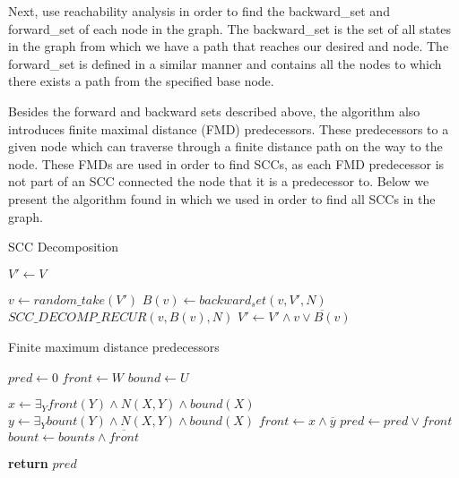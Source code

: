 \documentclass[11pt]{article}
\begin{document}
        Next, use reachability analysis in order to find the backward\_set
        and forward\_set of each node in the graph. The backward\_set is 
        the set of all states in the graph from which we have a path that
        reaches our desired and node. The forward\_set is defined in a similar
        manner and contains all the nodes to which there exists a path from
        the specified base node.

        Besides the forward and backward sets described above, the algorithm
        also introduces finite maximal distance (FMD) predecessors. These
        predecessors to a given node which can traverse through a finite
        distance path on the way to the node. These FMDs are used in order
        to find SCCs, as each FMD predecessor is not part of an SCC
        connected the node that it is a predecessor to. Below we present
        the algorithm found in \cite{scc} which we used in order to find
        all SCCs in the graph.

        \begin{algorithm}[H]
            \caption{SCC Decomposition}\label{scc}
                \State $V' \gets V$

                    \State $v \gets random\_take(V')$
                    \State $B(v) \gets backward_set(v, V', N)$
                    \State $SCC\_DECOMP\_RECUR(v, B(v), N)$
                    \State $V' \gets V' \wedge \overline{v \vee B(v)}$
                \EndWhile
            \EndProcedure
        \end{algorithm}

        \begin{algorithm}[H]
            \caption{Finite maximum distance predecessors}\label{fmd}
                \State $pred \gets 0$
                \State $front \gets W$
                \State $bound \gets U$
                
                    \State $x \gets \exists_Y front(Y)\wedge N(X, Y) \wedge bound(X)$
                    \State $y \gets \exists_Y bount(Y)\wedge N(X, Y) \wedge bound(X)$
                    \State $front \gets x \wedge \overline{y}$
                    \State $pred \gets pred \vee front$
                    \State $bount \gets bounts \wedge \overline{front}$
                \EndWhile

                \State \textbf{return} $pred$
            \EndProcedure
        \end{algorithm}
\end{document}

